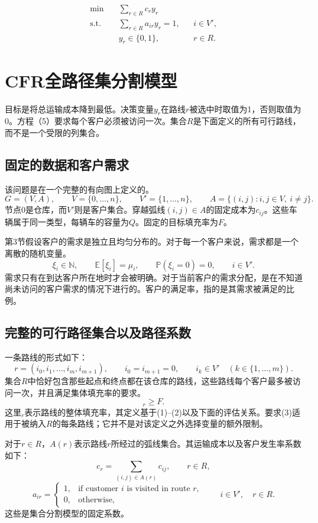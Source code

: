 \documentclass{article}
\begin{document}
\begin{align}
\min\quad & \sum_{r\in R}c_r y_r \tag{4}\\
\text{s.t.}\quad & \sum_{r\in R}a_{ir}y_r=1, && i\in V', \tag{5}\\
& y_r\in\{0,1\}, && r\in R. \tag{6}
\end{align}

\section*{CFR全路径集分割模型}
目标是将总运输成本降到最低。决策变量$y_r$在路线$r$被选中时取值为1，否则取值为0。方程（5）要求每个客户必须被访问一次。集合$R$是下面定义的所有可行路线，而不是一个受限的列集合。

\subsection*{固定的数据和客户需求}
该问题是在一个完整的有向图上定义的。
\[
G=(V,A),\qquad V=\{0,\ldots,n\},\qquad V'=\{1,\ldots,n\},
\qquad A=\{(i,j):i,j\in V,\ i\ne j\}.
\]
节点$0$是仓库，而$V'$则是客户集合。穿越弧线$(i,j)\in A$的固定成本为$c_{ij}$。这些车辆属于同一类型，每辆车的容量为$Q$。固定的目标填充率为$F$。

第3节假设客户的需求是独立且均匀分布的。对于每一个客户来说，需求都是一个离散的随机变量。
\[
\xi_i\in\mathbb N,\qquad
\mathbb E[\xi_i]=\mu_i,\qquad
\mathbb P(\xi_i=0)=0,
\qquad i\in V'.
\]
需求只有在到达客户所在地时才会被明确。对于当前客户的需求分配，是在不知道尚未访问的客户需求的情况下进行的。客户的满足率，指的是其需求被满足的比例。

\subsection*{完整的可行路径集合以及路径系数}
一条路线的形式如下：
\[
r=(i_0,i_1,\ldots,i_m,i_{m+1}),\qquad
 i_0=i_{m+1}=0,\qquad
 i_k\in V'\quad(k\in\{1,\ldots,m\}).
\]
集合$R$中恰好包含那些起点和终点都在该仓库的路线，这些路线每个客户最多被访问一次，并且满足集体填充率的要求。
\begin{equation}
{}_r\ge F. \tag{3}
\end{equation}
这里${}_r$表示路线的整体填充率，其定义基于(1)--(2)以及下面的评估关系。要求(3)适用于被纳入$R$的每条路线；它并不是对该定义之外选择变量的额外限制。

对于$r\in R$，$A(r)$表示路线$r$所经过的弧线集合。其运输成本以及客户发生率系数如下：
\[
c_r=\sum_{(i,j)\in A(r)}c_{ij},\qquad r\in R,
\]
\[
a_{ir}=\begin{cases}
1,&\text{if customer }i\text{ is visited in route }r,\\
0,&\text{otherwise},
\end{cases}
\qquad i\in V',\quad r\in R.
\]
这些是集合分割模型的固定系数。
\end{document}
